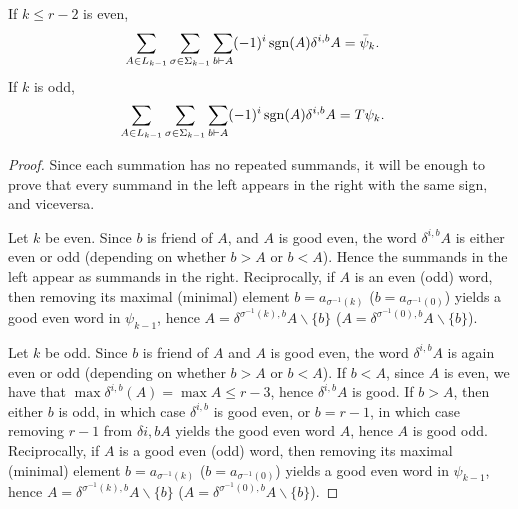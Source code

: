 \newcommand{\mi}{{\sigma^{-1}(0)}}
\newcommand{\ma}{{\sigma^{-1}(k)}}

\begin{lemma}\label{lemma:pair} If $k\leq r-2$ is even,
\begin{align*}
	\sum_{A\in L_{k-1}}\sum_{\sigma\in \Sigma_{k-1}}\sum_{b\vdash A}(-1)^i\operatorname*{sgn}(A)\delta^{i,b}A &= \bar{\psi}_k.
\end{align*}
If $k$ is odd,
\begin{align*}
	\sum_{A\in L_{k-1}}\sum_{\sigma\in \Sigma_{k-1}}\sum_{b\vdash A}(-1)^i\operatorname*{sgn}(A)\delta^{i,b}A &= T\psi_k.
\end{align*}
\end{lemma}
\begin{proof}
Since each summation has no repeated summands, it will be enough to prove that every summand in the left appears in the right with the same sign, and viceversa.


Let $k$ be even. Since $b$ is friend of $A$, and $A$ is good even, the word $\delta^{i,b}A$ is either even or odd (depending on whether $b>A$ or $b<A$).  Hence the summands in the left appear as summands in the right. Reciprocally, if $A$ is an even (odd) word, then removing its maximal (minimal) element $b=a_{\ma}$ ($b=a_{\mi}$) yields a good even word in $\psi_{k-1}$, hence $A = \delta^{\ma,b}A\smallsetminus\{b\}$ ($A = \delta^{\mi,b}A\smallsetminus\{b\}$).

Let $k$ be odd. Since $b$ is friend of $A$ and $A$ is good even, the word $\delta^{i,b}A$ is again even or odd (depending on whether $b>A$ or $b<A$). If $b<A$, since $A$ is even, we have that $\max \delta^{i,b}(A) = \max A \leq r-3$, hence $\delta^{i,b}A$ is good. If $b>A$, then either $b$ is odd, in which case $\delta^{i,b}$ is good even, or $b=r-1$, in which case removing $r-1$ from $\delta{i,b}A$ yields the good even word $A$, hence $A$ is good odd. Reciprocally, if $A$ is a good even (odd) word, then removing its maximal (minimal) element $b=a_{\ma}$ ($b=a_{\mi}$) yields a good even word in $\psi_{k-1}$, hence $A = \delta^{\ma,b}A\smallsetminus\{b\}$ ($A = \delta^{\mi,b}A\smallsetminus\{b\}$).



\end{proof}
